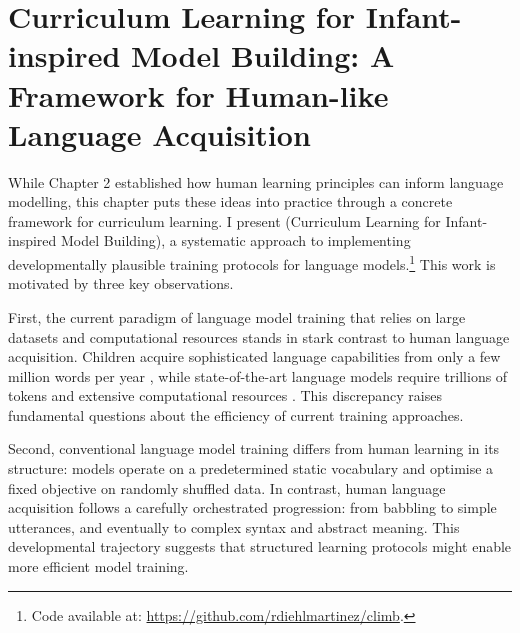 \chapter{Curriculum Learning for Infant-inspired Model Building: A Framework for Human-like Language Acquisition}
\label{chapter:CLIMB}





While Chapter 2 established how human learning principles can inform language modelling, this chapter puts these ideas into practice through a concrete framework for curriculum learning. I present \climb (Curriculum Learning for Infant-inspired Model Building), a systematic approach to implementing developmentally plausible training protocols for language models.\footnote{Code available at: \url{https://github.com/rdiehlmartinez/climb}.} This work is motivated by three key observations.

First, the current paradigm of language model training that relies on large datasets and computational resources stands in stark contrast to human language acquisition. Children acquire sophisticated language capabilities from only a few million words per year \citep{gilkerson2017mapping}, while state-of-the-art language models require trillions of tokens and extensive computational resources \citep{zhang2021need, zhao2023llmsurvey}. This discrepancy raises fundamental questions about the efficiency of current training approaches.

Second, conventional language model training differs from human learning in its structure: models operate on a predetermined static vocabulary and optimise a fixed objective on randomly shuffled data. In contrast, human language acquisition follows a carefully orchestrated progression: from babbling to simple utterances, and eventually to complex syntax and abstract meaning. This developmental trajectory suggests that structured learning protocols might enable more efficient model training.

